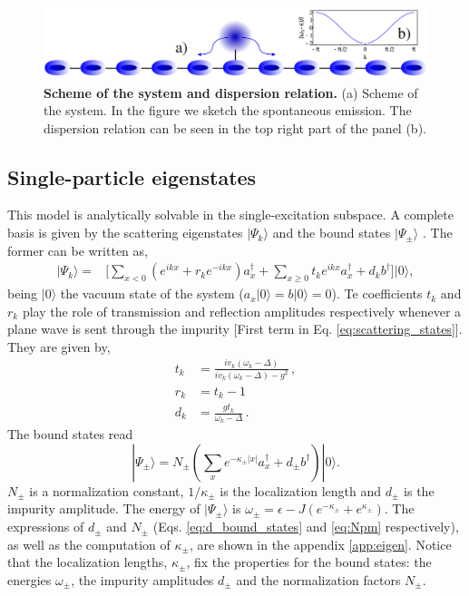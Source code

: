 \documentclass[aps,pra,twocolumn,floatfix,superscriptaddress]{revtex4-1}%
\begin{document}
\begin{figure}[thb!]
\includegraphics[width=1\columnwidth]{fig1_imp_gimp.pdf}
\caption{{\bf Scheme of the system and dispersion relation.} (a) Scheme of the system. In the figure we sketch the spontaneous emission. The dispersion relation can be seen in the top right part of the panel (b).}\label{fig:scheme}
\end{figure}


\subsection{Single-particle eigenstates}

This model is analytically solvable in the single-excitation subspace. A complete basis is given by the scattering eigenstates $|\Psi_k\rangle$ \cite{Nori2008a} and the bound states $|\Psi_\pm\rangle$ \cite{Longo2010,Longo2011}. The former can be written as,
\begin{align}
\label{eq:scattering_states} 
|\Psi_k\rangle = & \Big [ \sum_{x<0}(e^{ikx}+r_k e^{-ikx})a_x^\dagger 
 +  \sum_{x\geq 0} t_k e^{ikx} a_x^\dagger 
+ d_k b^\dagger \Big]  |0\rangle ,
\end{align}
being $|0\rangle$ the vacuum state of the system ($a_x|0\rangle=b|0\rangle = 0$).
Te coefficients 
 $t_k$ and $r_k$ play the role of  
 transmission and reflection amplitudes respectively
whenever a plane wave is sent through the impurity [First term in Eq. \eqref{eq:scattering_states}].  They are given by, 
\begin{align}
\label{eq:transmission}
t_k & =\frac{iv_k(\omega_k - \Delta)}{iv_k(\omega_k-\Delta)-g^2} \, , 
\\
r_k&=t_k-1 
\\ 
d_k  &= \frac{g t_k}{\omega_k-\Delta} \,
\label{eq:d_scattering_states}.
\end{align} 
The bound states read
\begin{equation}
 |\Psi_\pm\rangle =  N_\pm \left(\sum_x e^{-\kappa_\pm |x|} a_x^\dagger + d_\pm b^\dagger\right)|0\rangle.\label{eq:bound_states}
\end{equation} 
$N_\pm$ is a normalization constant, $1/\kappa_\pm$ is the localization length and $d_\pm$ is  the impurity amplitude. The energy of $|\Psi_\pm\rangle$ is $\omega_\pm = \epsilon - J(e^{-\kappa_\pm} + e^{\kappa_\pm})$. The expressions of $d_\pm$ and $N_\pm$ (Eqs. \eqref{eq:d_bound_states} and \eqref{eq:Npm} respectively), as well as the computation of $\kappa_\pm$, are shown in the appendix \ref{app:eigen}. Notice that the localization lengths,  $\kappa_\pm$, 
fix the properties for the bound states: the energies $\omega_\pm$, the impurity amplitudes $d_\pm$ and the normalization factors $N_\pm$.
\end{document}
